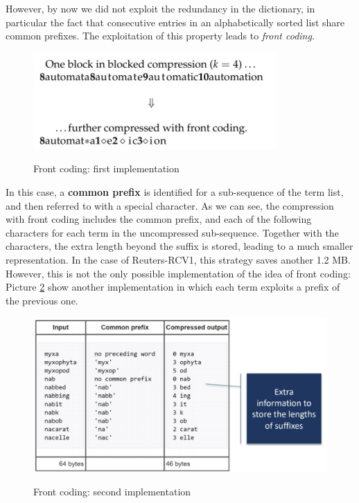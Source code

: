 However, by now we did not exploit the redundancy in the dictionary, in particular the fact that consecutive entries in an alphabetically sorted list share common prefixes. The exploitation of this property leads to \textit{front coding}.

\begin{figure}[h!]
		\centering
		\includegraphics[scale = 2.0]{img/front coding.jpg}
		\label{front}
        \caption{Front coding: first implementation}
\end{figure}

In this case, a \textbf{common prefix} is identified for a sub-sequence of the term list, and then referred to with a special character. As we can see, the compression with front coding includes the common prefix, and each of the following characters for each term in the uncompressed sub-sequence. Together with the characters, the extra length beyond the suffix is stored, leading to a much smaller representation. In the case of Reuters-RCV1, this strategy saves another 1.2 MB. However, this is not the only possible implementation of the idea of front coding: Picture \ref{front2} show another implementation in which each term exploits a prefix of the previous one.

\begin{figure}[h!]
		\centering
		\includegraphics[scale = 0.5]{img/front coding2.jpg}
		\label{front2}
        \caption{Front coding: second implementation}
\end{figure}


